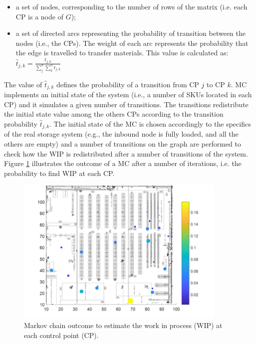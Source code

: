 \begin{itemize}
    \item a set of nodes, corresponding to the number of rows of the matrix (i.e. each CP is a node of $G$);
    \item a set of directed arcs representing the probability of transition between the nodes (i.e., the CPs). The weight of each arc represents the probability that the edge is travelled to transfer materials. This value is calculated as: ${\hat{t}}_{j,k}=\frac{t_{j,k}}{\sum_{j}^{n}\sum_{k}^{n}t_{j,k}}$
\end{itemize}

The value of ${\hat{t}}_{j,k}$ defines the probability of a transition from CP $j$ to CP $k$. MC implements an initial state of the system (i.e., a number of SKUs located in each CP) and it simulates a given number of transitions.  The transitions redistribute the initial state value among the others CPs according to the transition probability ${\hat{t}}_{j,k}$. The initial state of the MC is chosen accordingly to the specifics of the real storage system (e.g., the inbound node is fully loaded, and all the others are empty) and a number of transitions on the graph are performed to check how the WIP is redistributed after a number of transitions of the system. Figure \ref{fig_markovChain_wh} illustrates the outcome of a MC after a number of iterations, i.e. the probability to find WIP at each CP.

\begin{figure}[hbt!]
\centering
\includegraphics[width=0.9\textwidth]{SectionWarehouses/design_figures/fig_markovChain.png}
\captionsetup{type=figure}
\caption{Markov chain outcome to estimate the work in process (WIP) at each control point (CP).}
\label{fig_markovChain_wh}
\end{figure}

